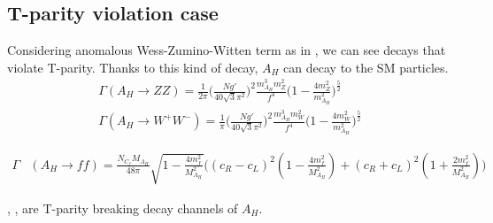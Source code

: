 


\subsection{T-parity violation case}
\label{sec:LHT:TPV}
Considering anomalous Wess-Zumino-Witten term as in , 
we can see decays that violate T-parity. 
Thanks to this kind of decay, $A_H$ can decay to the SM particles.
\begin{align} \label{eq:LHT:TPVzz}
  \Gamma(A_H \rightarrow ZZ) = \frac{1}{2\pi}\big( \frac{Ng'}{40\sqrt{3}\pi^2} \big)^2\frac{m_{A_H}^3 m_Z^2}{f^4}
 \big( 1-\frac{4 m_Z^2}{m_{A_H}^2} \big)^{\frac{5}{2}}  \\
 \label{eq:LHT:TPVww} 
 \Gamma(A_H \rightarrow W^+ W^-) = \frac{1}{\pi}\big( \frac{Ng'}{40\sqrt{3}\pi^2} \big)^2 \frac{m_{A_H}^3 m_W^2}{f^4}
 \big( 1-\frac{4 m_W^2}{m_{A_H}^2} \big)^{\frac{5}{2}}  
\end{align}

\begin{align} \label{eq:LHT:TPVff}
 \Gamma&(A_H \rightarrow ff) = 
 \frac{N_{C_f}M_{A_H}}{48\pi}\sqrt{1-\frac{4m_f^2}{M_{A_H}^2}} 
 \big( (c_R - c_L )^2(1-\frac{4m_f^2}{M_{A_H}^2}) + (c_R + c_L)^2(1+\frac{2m_f^2}{M_{A_H}^2}) \big)
\end{align}

, ,  are T-parity breaking decay channels 
of $A_H$. 
% 

